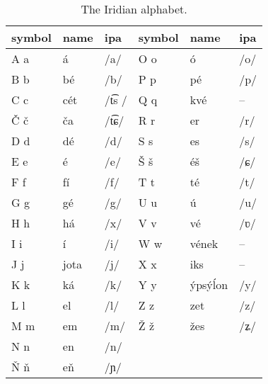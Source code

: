\begin{table}
	\footnotesize\sffamily
 	\caption{The Iridian alphabet.}
	\medskip
	\begin{tabu}to 0.9 
		\toprule
		{{\sc  symbol}} & {\sc name} & {\sc ipa} & {{\sc  symbol}} & {\sc name} & {\sc ipa}\\
		\midrule
		A a	  	& á 		& /a/				& O o 	& ó 				& /o/\\
		B b			& bé	& /b/				& P p		& pé				& /p/\\
		C c			& cét & /t͡s /		& Q q		& kvé				& --\\
		Č č			& ča		& /t͡ɕ/			& R r		& er					& /r/\\
		D d			& dé	& /d/				& S s		& es					& /s/\\
		E e			& é		& /e/				& Š š		& éš 				& /ɕ/\\
		F f			& fí	& /f/				& T t		& té				& /t/\\
		G g			& gé 	& /g/				& U u 	& ú					& /u/\\
		H h			& há 		& /x/				& V v 	& vé 				& /ʋ/\\
		I i			& í 		& /i/				& W w		& vének				& --\\
		J j			& jota	& /j/				& X x		& iks 				& --\\
		K k 		& ká 		& /k/				& Y y		& ýpsý\'lon		& /y/\\
		L l 		& el 		& /l/				& Z z		& zet 				& /z/\\
		M m			& em 		& /m/				& \v{Z} \v{z}		& žes 				& /ʑ/ \\
		N n			& en		& /n/				&				&							&	\\
		\v{N} \v{n}	& e\v{n}	& /ɲ/				&				&							&	\\
		\bottomrule
	\end{tabu}
\end{table}

